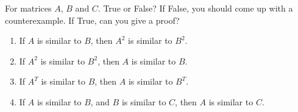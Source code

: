 \documentclass{ximera}
\author{}
\begin{document}
\begin{exercise}

For matrices $A$, $B$ and $C$.  True or False?  If False, you should come up with a counterexample.  If True, can you give a proof?

 \begin{enumerate}
 
 \item If $A$ is similar to $B$, then $A^2$ is similar to $B^2$.
 \begin{multipleChoice}
 \end{multipleChoice}

 \item If $A^2$ is similar to $B^2$, then $A$ is similar to $B$.
 \begin{multipleChoice}
 \end{multipleChoice}

  \item If $A^T$ is similar to $B$, then $A$ is similar to $B^T$.
 \begin{multipleChoice}
 \end{multipleChoice}

 \item If $A$ is similar to $B$, and $B$ is similar to $C$, then $A$ is similar to $C$.
 \begin{multipleChoice}
 \end{multipleChoice}

 \end{enumerate}

 
\end{exercise}
\end{document}
